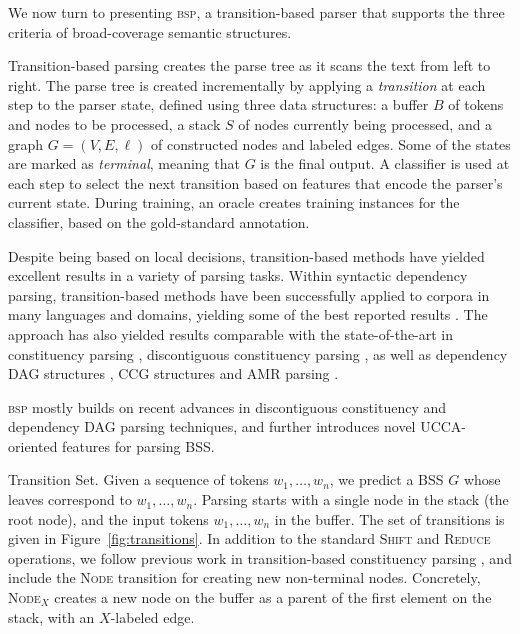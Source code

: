 \documentclass[11pt]{article}
\makeatletter
\newcommand{\figref}[1]{Figure~\ref{#1}}
\renewcommand{\paragraph}{
  \@startsection{paragraph}{4}
  {\z@}{.5ex \@plus .5ex \@minus .2ex}{-1em}
  {\normalfont\normalsize\bfseries}
}
\makeatother
\begin{document}
We now turn to presenting \textsc{bsp},
a transition-based parser that supports the three criteria of broad-coverage
semantic structures.

Transition-based parsing \cite{Nivre03anefficient} creates the parse tree
as it scans the text from left to right.
The parse tree is created incrementally by applying a \textit{transition} at each step to the parser state,
defined using three data structures: a buffer $B$ of tokens and nodes to be processed,
a stack $S$ of nodes currently being processed,
and a graph $G=(V,E,\ell)$ of constructed nodes and labeled edges.
Some of the states are marked as \textit{terminal}, meaning that $G$ is the final output.
A classifier is used at each step to select the next transition based on features
that encode the parser's current state.
During training, an oracle creates training instances for the classifier,
based on the gold-standard annotation.

Despite being based on local decisions, transition-based methods have yielded excellent
results in a variety of parsing tasks.
Within syntactic dependency parsing, transition-based methods
have been successfully applied to corpora in many languages and domains, yielding some
of the best reported results \cite{dyer2015transition,ballesteros2015improved}. 
The approach has also yielded results comparable with the state-of-the-art in
constituency parsing \cite{sagae2005classifier,zhang2009transition,zhu2013fast},
discontiguous constituency parsing \cite{maier2015discontinuous},
as well as dependency DAG structures
\cite{sagae2008shift,tokgoz2015transition}, CCG structures \cite{ambati2015incremental}
and AMR parsing \cite{wang2015transition}.

\textsc{bsp} mostly builds on recent advances in discontiguous constituency
and dependency DAG parsing techniques, and further introduces novel UCCA-oriented features for parsing BSS.

\paragraph{Transition Set.}
Given a sequence of tokens $w_1, \ldots, w_n$, we predict a BSS $G$ whose leaves
correspond to  $w_1, \ldots, w_n$.
Parsing starts with a single node in the stack (the root node), and the input tokens
$w_1, \ldots, w_n$ in the buffer. The set of transitions is given in \figref{fig:transitions}.
In addition to the standard \textsc{Shift} and \textsc{Reduce} operations, 
we follow previous work in transition-based constituency parsing \cite{sagae2005classifier}, and include the \textsc{Node} transition for creating new non-terminal nodes.
Concretely, \textsc{Node$_X$} creates a new node on the buffer as a parent of the first element on the stack, with an $X$-labeled edge.
\end{document}
